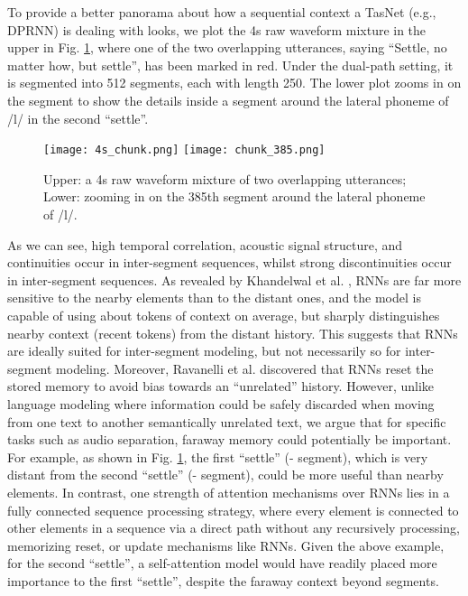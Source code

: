 \documentclass{article}
\begin{document}
To provide a better panorama about how a sequential context a TasNet (e.g., DPRNN) is dealing with looks, we plot the 4s raw waveform mixture in the upper in Fig. \ref{fig:4s}, where one of the two overlapping utterances, saying ``Settle, no matter how, but settle'', has been marked in red. Under the dual-path setting, it is segmented into 512 segments, each with length 250. The lower plot zooms in on the  segment to show the details inside a segment around the lateral phoneme of /l/ in the second ``settle''. 
\begin{figure}[thb]
\vspace{-0.1cm}
 \centering
    \texttt{[image: 4s\_chunk.png]}
    \texttt{[image: chunk\_385.png]}
\caption{Upper: a 4s raw waveform mixture of two overlapping utterances; Lower: zooming in on the 385th segment around the lateral phoneme of /l/.}
\vspace{-0.5cm}
\label{fig:4s}
\end{figure}
As we can see, high temporal correlation, acoustic signal structure, and continuities occur in inter-segment sequences, whilst strong discontinuities occur in inter-segment sequences. As revealed by Khandelwal et al. \cite{khandelwal2018sharp}, RNNs are far more sensitive to the nearby elements than to the distant ones, and the model is capable of using about  tokens of context on average, but sharply distinguishes nearby context (recent  tokens) from the distant history. This suggests that RNNs are ideally suited for inter-segment modeling, but not necessarily so for inter-segment modeling. Moreover, Ravanelli et al. \cite{ravanelli2018light} discovered that RNNs reset the stored memory to avoid bias towards an ``unrelated'' history. However, unlike language modeling where information could be safely discarded when moving from one text to another semantically unrelated text, we argue that for specific tasks such as audio separation, faraway memory could potentially be important. For example, as shown in Fig. \ref{fig:4s}, the first ``settle'' (-  segment), which is very distant from the second ``settle'' (-  segment), could be more useful than nearby elements. In contrast, one strength of attention mechanisms over RNNs lies in a fully connected sequence processing strategy, where every element is connected to other elements in a sequence via a direct path without any recursively processing, memorizing reset, or update mechanisms like RNNs. Given the above example, for the second ``settle'', a self-attention model would have readily placed more importance to the first ``settle'', despite the faraway context beyond  segments.
\end{document}
